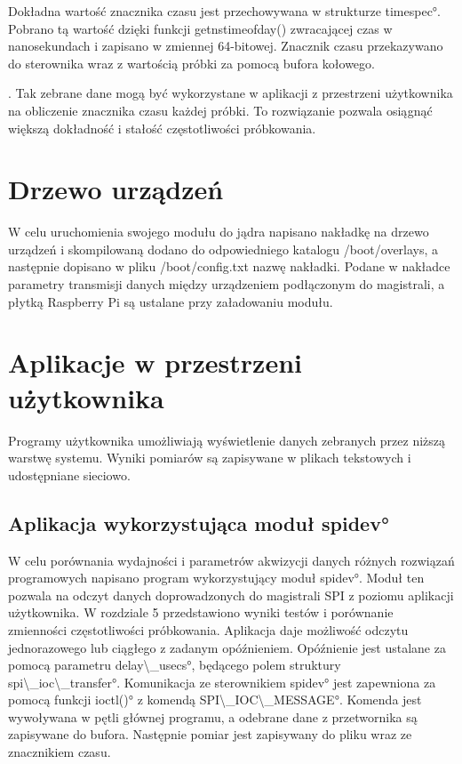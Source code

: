 Dokładna wartość znacznika czasu jest przechowywana w strukturze \ang{timespec}. Pobrano tą wartość dzięki funkcji getnstimeofday() zwracającej czas w nanosekundach i zapisano w zmiennej 64-bitowej. Znacznik czasu przekazywano do sterownika wraz z wartością próbki za pomocą bufora kołowego.


. Tak zebrane dane mogą być wykorzystane w aplikacji z przestrzeni użytkownika na obliczenie znacznika czasu każdej próbki. To rozwiązanie pozwala osiągnąć większą dokładność i stałość częstotliwości próbkowania.


\section{Drzewo urządzeń}
W celu uruchomienia swojego modułu do jądra napisano nakładkę na drzewo urządzeń i skompilowaną dodano do odpowiedniego katalogu /boot/overlays, a następnie dopisano w pliku /boot/config.txt nazwę nakładki. Podane w nakładce parametry transmisji danych między urządzeniem podłączonym do magistrali, a płytką Raspberry Pi są ustalane przy załadowaniu modułu. 


\section{Aplikacje w przestrzeni użytkownika}

Programy użytkownika umożliwiają wyświetlenie danych zebranych przez niższą warstwę systemu. Wyniki pomiarów są zapisywane w plikach tekstowych i udostępniane sieciowo.

\subsection{Aplikacja wykorzystująca moduł \ang{spidev}}

W celu porównania wydajności i parametrów akwizycji danych różnych rozwiązań programowych napisano program wykorzystujący moduł \ang{spidev}. Moduł ten pozwala na odczyt danych doprowadzonych do magistrali SPI z poziomu aplikacji użytkownika. W rozdziale 5 przedstawiono wyniki testów i porównanie zmienności częstotliwości próbkowania. Aplikacja daje możliwość odczytu jednorazowego lub ciągłego z zadanym opóźnieniem. Opóźnienie jest ustalane za pomocą parametru \ang{delay\_usecs}, będącego polem struktury \ang{spi\_ioc\_transfer}. Komunikacja ze sterownikiem \ang{spidev} jest zapewniona za pomocą funkcji \ang{ioctl()} z komendą \ang{SPI\_IOC\_MESSAGE}. Komenda jest wywoływana w pętli głównej programu, a odebrane dane z przetwornika są zapisywane do bufora. Następnie pomiar jest zapisywany do pliku wraz ze znacznikiem czasu.

